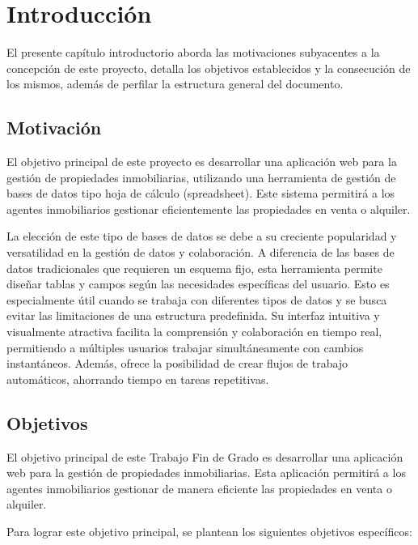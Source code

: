 
\chapter {Introducción}
\label{sec:intro}


El presente capítulo introductorio aborda las motivaciones subyacentes a la concepción de este proyecto, detalla los objetivos establecidos y la consecución de los mismos, además de perfilar la estructura general del documento.


\section{Motivación}


El objetivo principal de este proyecto es desarrollar una aplicación web para la gestión de propiedades inmobiliarias, utilizando una herramienta de gestión de bases de datos tipo hoja de cálculo (spreadsheet). Este sistema permitirá a los agentes inmobiliarios gestionar eficientemente las propiedades en venta o alquiler.

La elección de este tipo de bases de datos se debe a su creciente popularidad y versatilidad en la gestión de datos y colaboración. A diferencia de las bases de datos tradicionales que requieren un esquema fijo, esta herramienta permite diseñar tablas y campos según las necesidades específicas del usuario. Esto es especialmente útil cuando se trabaja con diferentes tipos de datos y se busca evitar las limitaciones de una estructura predefinida. Su interfaz intuitiva y visualmente atractiva facilita la comprensión y colaboración en tiempo real, permitiendo a múltiples usuarios trabajar simultáneamente con cambios instantáneos. Además, ofrece la posibilidad de crear flujos de trabajo automáticos, ahorrando tiempo en tareas repetitivas.


\section{Objetivos}


El objetivo principal de este Trabajo Fin de Grado es desarrollar una aplicación web para la gestión de propiedades inmobiliarias. Esta aplicación permitirá a los agentes inmobiliarios gestionar de manera eficiente las propiedades en venta o alquiler.

Para lograr este objetivo principal, se plantean los siguientes objetivos específicos:

